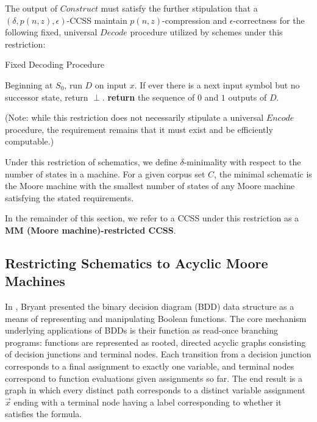 \documentclass{article}
\theoremstyle{definition}
\begin{document}
The output of $Construct$ must satisfy the further stipulation that a 
$(\delta, p(n,z), \epsilon)$-CCSS maintain $p(n,z)$-compression 
and $\epsilon$-correctness for the following fixed, universal $Decode$ procedure 
utilized by schemes under this restriction: 

\begin{algorithm}[H]
\caption{Fixed Decoding Procedure}\label{AMMDecode}
\begin{algorithmic}[1]
\State Beginning at $S_0$, run $D$ on input $x$.  If ever there is a next input symbol but no successor state, return $\perp$.
\State \textbf{return} the sequence of $0$ and $1$ outputs of $D$.
\EndProcedure
\end{algorithmic}
\end{algorithm}

\noindent (Note: while this restriction does not necessarily stipulate a 
universal $Encode$ procedure, the requirement remains that it must exist 
and be efficiently computable.)

Under this restriction of schematics, we define $\delta$-minimality 
with respect to the number of states in a machine.  For a given corpus set $C$,
the minimal schematic is the Moore machine with the smallest number of states of any Moore machine 
satisfying the stated requirements.

In the remainder of this section, we refer to a CCSS under this restriction as a 
\textbf{MM (Moore machine)-restricted CCSS}.  

\subsection{Restricting Schematics to Acyclic Moore Machines}

In \cite{BDDs}, Bryant presented the binary decision diagram (BDD) data structure as a means of
representing and manipulating Boolean functions.  The core mechanism underlying applications 
of BDDs is their function as read-once branching programs: functions are 
represented as rooted, directed acyclic graphs consisting of decision junctions and terminal 
nodes.  Each transition from a decision junction corresponds to a final assignment to exactly 
one variable, and terminal nodes correspond to function evaluations given assignments so far.  
The end result is a graph in which every distinct path corresponds to a distinct variable 
assignment $\vec{x}$ ending with a terminal node having a label corresponding to whether it 
satisfies the formula.
\end{document}
